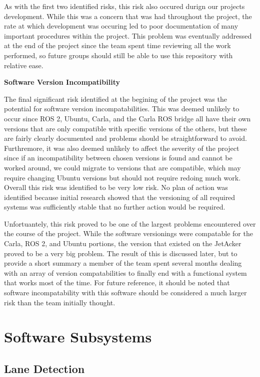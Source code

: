 \documentclass[titlepage,draft]{article}
\begin{document}
As with the first two identified risks, this risk also occured durign our projects development. While this was a concern that was had throughout the project, the rate at which development was occuring led to poor documentation of many important procedures within the project. This problem was eventually addressed at the end of the project since the team spent time reviewing all the work performed, so future groups should still be able to use this repository with relative ease.

\textbf{Software Version Incompatibility}

The final significant risk identified at the begining of the project was the potential for software version incompatabilities. This was deemed unlikely to occur since ROS 2, Ubuntu, Carla, and the Carla ROS bridge all have their own versions that are only compatible with specific versions of the others, but these are fairly clearly documented and problems should be straightforward to avoid. Furthremore, it was also deemed unlikely to affect the severity of the project since if an incompatibility between chosen versions is found and cannot be worked around, we could migrate to versions that are compatible, which may require changing Ubuntu versions but should not require redoing much work. Overall this risk was identified to be very low risk. No plan of action was identified because initial research showed that the versioning of all required systems was sufficiently stable that no further action would be required.

Unfortuantely, this risk proved to be one of the largest problems encountered over the course of the project. While the software versionings were compatable for the Carla, ROS 2, and Ubuntu portions, the version that existed on the JetAcker proved to be a very big problem. The result of this is discussed later, but to provide a short summary a member of the team spent several months dealing with an array of version compatabilities to finally end with a functional system that works most of the time. For future reference, it should be noted that software incompatability with this software should be considered a much larger risk than the team initially thought.


\section{Software Subsystems}

\subsection{Lane Detection}
\end{document}
